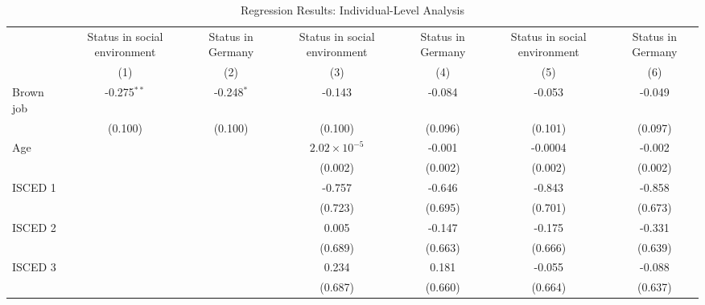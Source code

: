 \begin{table}[htbp]
   \caption{Regression Results: Individual-Level Analysis}
   \centering
   \begin{tabular}{lcccccc}
      \tabularnewline \midrule \midrule
                     & Status in social environment & Status in Germany & Status in social environment & Status in Germany & Status in social environment & Status in Germany\\  
                     & (1)                          & (2)               & (3)                          & (4)               & (5)                          & (6)\\  
      Brown job      & -0.275$^{**}$                & -0.248$^{*}$      & -0.143                       & -0.084            & -0.053                       & -0.049\\   
                     & (0.100)                      & (0.100)           & (0.100)                      & (0.096)           & (0.101)                      & (0.097)\\   
      Age            &                              &                   & $2.02\times 10^{-5}$         & -0.001            & -0.0004                      & -0.002\\   
                     &                              &                   & (0.002)                      & (0.002)           & (0.002)                      & (0.002)\\   
      ISCED 1        &                              &                   & -0.757                       & -0.646            & -0.843                       & -0.858\\   
                     &                              &                   & (0.723)                      & (0.695)           & (0.701)                      & (0.673)\\   
      ISCED 2        &                              &                   & 0.005                        & -0.147            & -0.175                       & -0.331\\   
                     &                              &                   & (0.689)                      & (0.663)           & (0.666)                      & (0.639)\\   
      ISCED 3        &                              &                   & 0.234                        & 0.181             & -0.055                       & -0.088\\   
                     &                              &                   & (0.687)                      & (0.660)           & (0.664)                      & (0.637)\\   

\end{tabular}
\end{table}

